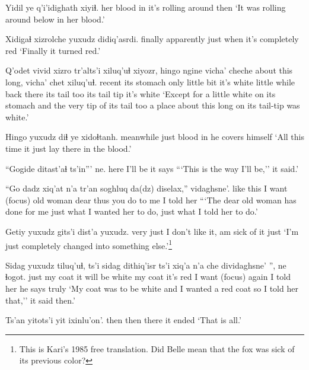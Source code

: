 \documentclass[12pt]{article}
\begin{document}
\gll Yidil ye q'i'idighath xiyiɬ.
{her blood} in {it's rolling around} then
\glt `It was rolling around below in her blood.'
\glend

\gll Xidigaɬ xizrolche yuxudz didiq'asrdi. 
finally apparently just {when it's completely red}
\glt `Finally it turned red.'
\glend

\gll Q'odet vivid xizro tr'alts'i xiluq'uɬ xiyozr, hingo ngine vicha' cheche {about this long,} vicha' chet xiluq'uɬ.
recent {its stomach} only {little bit} {it's white} {little} while {back there} {its tail} too {} {its tail} tip {it's white}
\glt `Except for a little white on its stomach and the very tip of its tail too a place about this long on its tail-tip was white.'
\glend

\gll Hingo yuxudz diɬ ye xidoɬtanh.
meanwhile just blood in {he covers himself}
\glt `All this time it just lay there in the blood.'
\glend

\gll ``Gogide ditast'aɬ ts'in''' ne.
{here} {I'll be} {} {it says}
\glt ```This is the way I'll be,'' it said.'
\glend

\gll ``{Go dadz} xiq'at n'a tr'an soghluq da(dz) diselax,'' vidaghsne'.
{like this} {I want} {(focus)} {old woman} dear thus {you do to me} {I told her}
\glt ```The dear old woman has done for me just what I wanted her to do, just what I told her to do.'
\glend

\gll Getiy yuxudz {gits'i dist'a} yuxudz.
very just {I don't like it, am sick of it} just
\glt `I'm just completely changed into something else.'\footnote{This is Kari's 1985 free translation. Did Belle mean that the fox was sick of its previous color?}
\glend

\gll Sidag yuxudz tiluq'uɬ, ts'i sidag dithiq'isr ts'i xiq'a n'a che {dividaghsne' '',} ne ɬogot. 
just {my coat} {it will be white} {} {my coat} {it's red} {} {I want} {(focus)} again {I told her} {he says} truly
\glt `My coat was to be white and I wanted a red coat so I told her that,'' it said then.'
\glend

\gll Ts'an yitots'i yit ixinlu'on'.
then then there {it ended}
\glt `That is all.'
\glend
\end{document}
